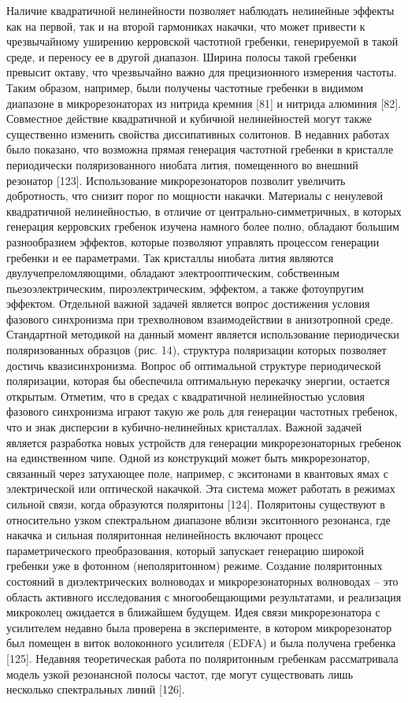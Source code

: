 Наличие квадратичной нелинейности позволяет наблюдать нелинейные эффекты как на первой, так и на второй гармониках накачки, что может привести к чрезвычайному уширению керровской частотной гребенки, генерируемой в такой среде, и переносу ее в другой диапазон. Ширина полосы такой гребенки превысит октаву, что чрезвычайно важно для прецизионного измерения частоты. Таким образом, например, были получены частотные гребенки в видимом диапазоне в микрорезонаторах из нитрида кремния [81] и нитрида алюминия [82]. Совместное действие квадратичной и кубичной нелинейностей могут также существенно изменить свойства диссипативных солитонов.
В недавних работах было показано, что возможна прямая генерация частотной гребенки в кристалле периодически поляризованного ниобата лития, помещенного во внешний резонатор [123]. Использование микрорезонаторов позволит увеличить добротность, что снизит порог по мощности накачки. Материалы с ненулевой квадратичной нелинейностью, в отличие от центрально-симметричных, в которых генерация керровских гребенок изучена намного более полно, обладают большим разнообразием эффектов, которые позволяют управлять процессом генерации гребенки и ее параметрами. Так кристаллы ниобата лития являются двулучепреломляющими, обладают электрооптическим, собственным пьезоэлектрическим, пироэлектрическим, эффектом, а также фотоупругим эффектом. Отдельной важной задачей является вопрос достижения условия фазового синхронизма при трехволновом взаимодействии в анизотропной среде. Стандартной методикой на данный момент является использование периодически поляризованных образцов (рис. 14), структура поляризации которых позволяет достичь квазисинхронизма. Вопрос об оптимальной структуре периодической поляризации, которая бы обеспечила оптимальную перекачку энергии, остается открытым. Отметим, что в средах с квадратичной нелинейностью условия фазового синхронизма играют такую же роль для генерации частотных гребенок, что и знак дисперсии в кубично-нелинейных кристаллах.
Важной задачей является разработка новых устройств для генерации микрорезонаторных гребенок на единственном чипе. Одной из конструкций может быть микрорезонатор, связанный через затухающее поле, например, с экситонами в квантовых ямах с электрической или оптической накачкой. Эта система может работать в режимах сильной связи, когда образуются поляритоны [124]. Поляритоны существуют в относительно узком спектральном диапазоне вблизи экситонного резонанса, где накачка и сильная поляритонная нелинейность включают процесс параметрического преобразования, который запускает генерацию широкой гребенки уже в фотонном (неполяритонном) режиме. Создание поляритонных состояний в диэлектрических волноводах и микрорезонаторных волноводах – это область активного исследования с многообещающими результатами, и реализация микроколец ожидается в ближайшем будущем. Идея связи микрорезонатора с усилителем недавно была проверена в эксперименте, в котором микрорезонатор был помещен в виток волоконного усилителя (EDFA) и была получена гребенка [125]. Недавняя теоретическая работа по поляритонным гребенкам рассматривала модель узкой резонансной полосы частот, где могут существовать лишь несколько спектральных линий [126].
